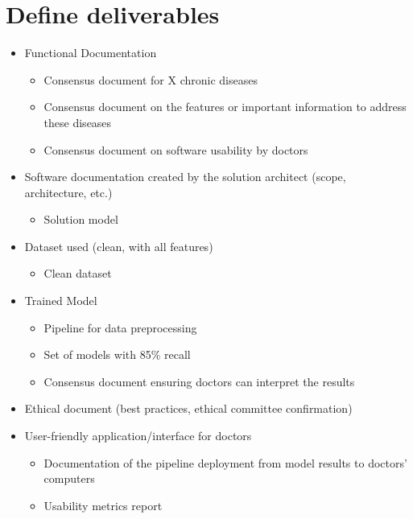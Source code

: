 \section{Define deliverables}\label{sec:define-deliverables}
\begin{itemize}
    \item Functional Documentation
    \begin{itemize}
        \item Consensus document for X chronic diseases
        \item Consensus document on the features or important information to address these diseases
        \item Consensus document on software usability by doctors
    \end{itemize}

    \item Software documentation created by the solution architect (scope, architecture, etc.)
    \begin{itemize}
        \item Solution model
    \end{itemize}

    \item Dataset used (clean, with all features)
    \begin{itemize}
        \item Clean dataset
    \end{itemize}

    \item Trained Model
    \begin{itemize}
        \item Pipeline for data preprocessing
        \item Set of models with 85\% recall
        \item Consensus document ensuring doctors can interpret the results
    \end{itemize}

    \item Ethical document (best practices, ethical committee confirmation)

    \item User-friendly application/interface for doctors
    \begin{itemize}
        \item Documentation of the pipeline deployment from model results to doctors' computers
        \item Usability metrics report
    \end{itemize}


\end{itemize}
